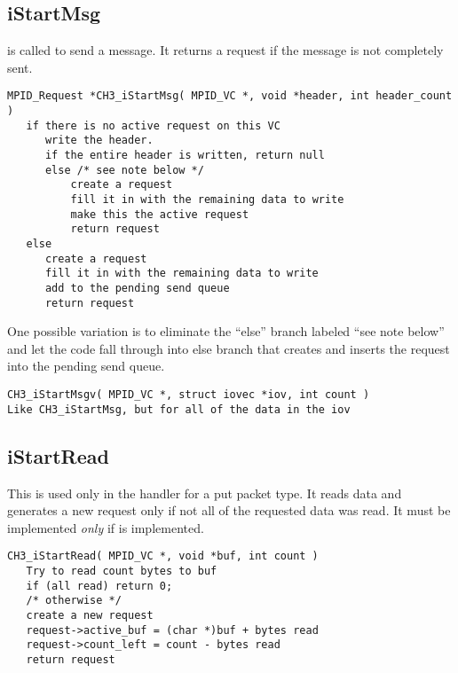 \documentclass{article}
\begin{document}
\subsection{iStartMsg}
 is called to send a message.  It returns a
request if the message is 
not completely sent.

\begin{verbatim}
MPID_Request *CH3_iStartMsg( MPID_VC *, void *header, int header_count )
   if there is no active request on this VC
      write the header.
      if the entire header is written, return null
      else /* see note below */
          create a request
          fill it in with the remaining data to write
          make this the active request
          return request               
   else
      create a request
      fill it in with the remaining data to write
      add to the pending send queue
      return request
\end{verbatim}
One possible variation is to eliminate the ``else'' branch labeled ``see note
below'' and let the code fall through into else branch that creates and
inserts the request into the pending send queue.

\begin{verbatim}
CH3_iStartMsgv( MPID_VC *, struct iovec *iov, int count )
Like CH3_iStartMsg, but for all of the data in the iov
\end{verbatim}

\subsection{iStartRead}
This is used only in the handler for a put packet type.  It reads data and
generates a new request only if not all of the requested data was
read.
It must be implemented \emph{only} if  is implemented.

\begin{verbatim}
CH3_iStartRead( MPID_VC *, void *buf, int count )
   Try to read count bytes to buf
   if (all read) return 0;
   /* otherwise */
   create a new request
   request->active_buf = (char *)buf + bytes read
   request->count_left = count - bytes read
   return request
\end{verbatim}
\end{document}
